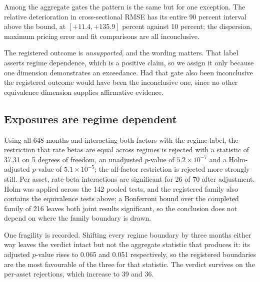 \documentclass[11pt]{article}
\begin{document}
Among the aggregate gates the pattern is the same but for one exception. The
relative deterioration in cross-sectional RMSE has its entire 90 percent interval %
above the bound, at $[+11.4, +135.9]$ percent against 10 percent; the dispersion, %
maximum pricing error and fit comparisons are all inconclusive. %

The registered outcome is \emph{unsupported}, and the wording matters. That label
asserts regime dependence, which is a positive claim, so we assign it only
because one dimension demonstrates an exceedance. Had that gate also been
inconclusive the registered outcome would have been the inconclusive one, since
no other equivalence dimension supplies affirmative evidence. %

\subsection{Exposures are regime dependent}

Using all 648 months and interacting both factors with the regime label, the %
restriction that rate betas are equal across regimes is rejected with a statistic
of 37.31 on 5 degrees of freedom, an unadjusted $p$-value of $5.2\times10^{-7}$ %
and a Holm-adjusted $p$-value of $5.1\times10^{-5}$; the all-factor restriction is %
rejected more strongly still. Per asset, rate-beta interactions are significant
for 26 of 70 after adjustment. %
Holm was applied across the 142 pooled tests, and the registered family also %
contains the equivalence tests above; a Bonferroni bound over the completed
family of 216 leaves both joint results significant, so the conclusion does not %
depend on where the family boundary is drawn. %

One fragility is recorded. Shifting every regime boundary by three months either
way leaves the verdict intact but not the aggregate statistic that produces it:
its adjusted $p$-value rises to 0.065 and 0.051 respectively, so the registered %
boundaries are the most favourable of the three for that statistic. The verdict
survives on the per-asset rejections, which increase to 39 and 36. %
\end{document}
